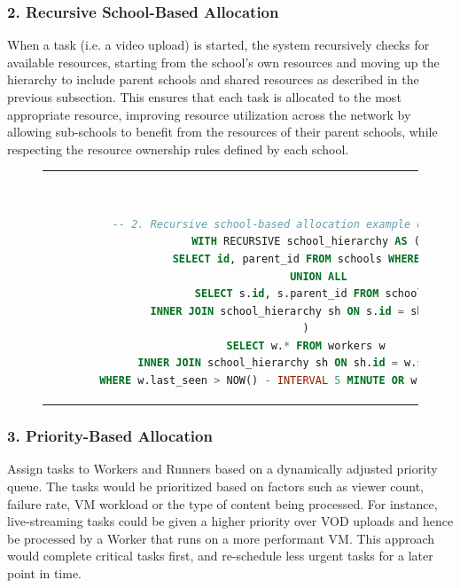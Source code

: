 \subsubsection{2. Recursive School-Based Allocation}
    When a task (i.e. a video upload) is started, the system recursively checks for available resources, starting from the school's own resources and moving up the hierarchy to include parent schools and shared resources as described in the previous subsection. This ensures that each task is allocated to the most appropriate resource, improving resource utilization across the network by allowing sub-schools to benefit from the resources of their parent schools, while respecting the resource ownership rules defined by each school.

    \begin{figure}[htpb]
      \begin{tabular}{c}
      \ \small \begin{lstlisting}[language=SQL]
        -- 2. Recursive school-based allocation example query
        WITH RECURSIVE school_hierarchy AS (
            SELECT id, parent_id FROM schools WHERE id = ?
            UNION ALL
            SELECT s.id, s.parent_id FROM schools s
            INNER JOIN school_hierarchy sh ON s.id = sh.parent_id
        )
        SELECT w.* FROM workers w
        INNER JOIN school_hierarchy sh ON sh.id = w.school_id
        WHERE w.last_seen > NOW() - INTERVAL 5 MINUTE OR w.shared = true;
        \end{lstlisting}
      \end{tabular}
      \label{fig:recursive-allocation}
    \end{figure}

\subsubsection{3. Priority-Based Allocation}
    Assign tasks to Workers and Runners based on a dynamically adjusted priority queue. The tasks would be prioritized based on factors such as viewer count, failure rate, \ac{VM} workload or the type of content being processed. For instance, live-streaming tasks could be given a higher priority over \ac{VOD} uploads and hence be processed by a Worker that runs on a more performant \ac{VM}. This approach would complete critical tasks first, and re-schedule less urgent tasks for a later point in time.

